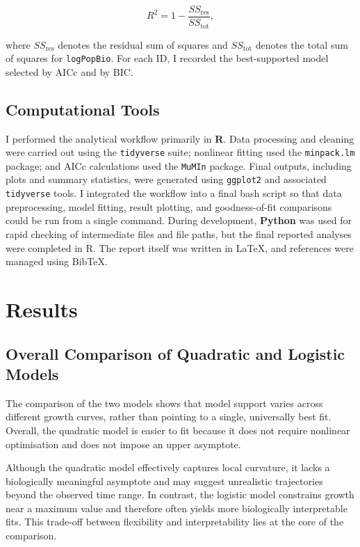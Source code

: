 \documentclass{article}
\begin{document}
\[
R^2 = 1 - \frac{SS_{\mathrm{res}}}{SS_{\mathrm{tot}}},
\]

where \(SS_{\mathrm{res}}\) denotes the residual sum of squares and \(SS_{\mathrm{tot}}\) denotes the total sum of squares for \texttt{logPopBio}. For each ID, I recorded the best-supported model selected by AICc and by BIC.

\subsection{Computational Tools}

I performed the analytical workflow primarily in \textbf{R}. Data processing and cleaning were carried out using the \texttt{tidyverse} suite; nonlinear fitting used the \texttt{minpack.lm} package; and AICc calculations used the \texttt{MuMIn} package. Final outputs, including plots and summary statistics, were generated using \texttt{ggplot2} and associated \texttt{tidyverse} tools. I integrated the workflow into a final bash script so that data preprocessing, model fitting, result plotting, and goodness-of-fit comparisons could be run from a single command. During development, \textbf{Python} was used for rapid checking of intermediate files and file paths, but the final reported analyses were completed in R. The report itself was written in \LaTeX{}, and references were managed using Bib\TeX{}.




\section{Results}

\subsection{Overall Comparison of Quadratic and Logistic Models}

The comparison of the two models shows that model support varies across different growth curves, rather than pointing to a single, universally best fit. Overall, the quadratic model is easier to fit because it does not require nonlinear optimisation and does not impose an upper asymptote.

Although the quadratic model effectively captures local curvature, it lacks a biologically meaningful asymptote and may suggest unrealistic trajectories beyond the observed time range. In contrast, the logistic model constrains growth near a maximum value and therefore often yields more biologically interpretable fits. This trade-off between flexibility and interpretability lies at the core of the comparison.
\end{document}
